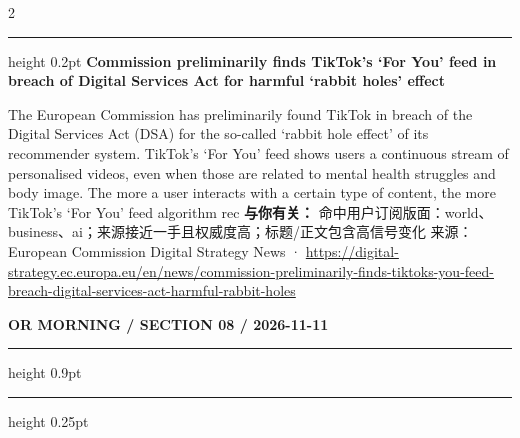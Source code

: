 \documentclass[10.5pt]{ctexart}
\begin{document}
\begin{multicols}{2}
\vspace{2mm}
\hrule height 0.2pt
\vspace{2mm}
{\large\bfseries Commission preliminarily finds TikTok’s ‘For You’ feed in breach of Digital Services Act for harmful ‘rabbit holes’ effect}\par
The European Commission has preliminarily found TikTok in breach of the Digital Services Act (DSA) for the so-called ‘rabbit hole effect’ of its recommender system. TikTok's ‘For You' feed shows users a continuous stream of personalised videos, even when those are related to mental health struggles and body image. The more a user interacts with a certain type of content, the more TikTok's ‘For You' feed algorithm rec
\textbf{与你有关：} 命中用户订阅版面：world、business、ai；来源接近一手且权威度高；标题/正文包含高信号变化
{\footnotesize\color{ormuted} 来源：European Commission Digital Strategy News · \url{https://digital-strategy.ec.europa.eu/en/news/commission-preliminarily-finds-tiktoks-you-feed-breach-digital-services-act-harmful-rabbit-holes}}
\end{multicols}
\newpage
{\small\bfseries OR MORNING / SECTION 08 / 2026-11-11}
\vspace{2mm}
\hrule height 0.9pt
\vspace{1.5mm}
\hrule height 0.25pt
\vspace{4mm}
\end{document}
